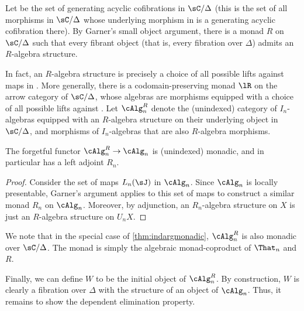 \documentclass{amsart}
\begin{document}
Let \sJ be the set of generating acyclic cofibrations in $\sC/\Delta$ (this is the set of all morphisms in $\sC/\Delta$ whose underlying morphism in \sC is a generating acyclic cofibration there).
By Garner's small object argument, there is a monad $R$ on $\sC/\Delta$ such that every fibrant object (that is, every fibration over $\Delta$) admits an $R$-algebra structure.

In fact, an $R$-algebra structure is precisely a choice of all possible lifts against maps in \sJ.
More generally, there is a codomain-preserving monad $\lR$ on the arrow category of $\sC/\Delta$, whose algebras are morphisms equipped with a choice of all possible lifts against \sJ.
Let $\cAlg_{n}^R$ denote the (unindexed) category of $I_n$-algebras equipped with an $R$-algebra structure on their underlying object in $\sC/\Delta$, and morphisms of $I_n$-algebras that are also $R$-algebra morphisms.

\begin{lem}
  The forgetful functor $\cAlg_{n}^R \to \cAlg_n$ is (unindexed) monadic, and in particular has a left adjoint $R_n$.
\end{lem}
\begin{proof}
  Consider the set of maps $L_n(\sJ)$ in $\cAlg_n$.
  Since $\cAlg_n$ is locally presentable, Garner's argument applies to this set of maps to construct a similar monad $R_n$ on $\cAlg_n$.
  Moreover, by adjunction, an $R_n$-algebra structure on $X$ is just an $R$-algebra structure on $U_n X$.
\end{proof}

We note that in the special case of \autoref{thm:indargmonadic}, $\cAlg_{n}^R$ is also monadic over $\sC/\Delta$.
The monad is simply the algebraic monad-coproduct of $\That_n$ and $R$.

Finally, we can define $W$ to be the initial object of $\cAlg_{n}^R$.
By construction, $W$ is clearly a fibration over $\Delta$ with the structure of an object of $\cAlg_n$.
Thus, it remains to show the dependent elimination property.
\end{document}
